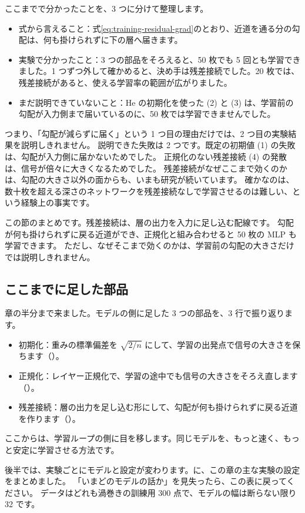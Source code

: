 ここまでで分かったことを、3 つに分けて整理します。
\begin{itemize}
\item 式から言えること：式\eqref{eq:training-residual-grad}のとおり、近道を通る分の勾配は、何も掛けられずに下の層へ届きます。
\item 実験で分かったこと：3 つの部品をそろえると、50 枚でも 5 回とも学習できました。1 つずつ外して確かめると、決め手は残差接続でした。20 枚では、残差接続があると、使える学習率の範囲が広がりました。
\item まだ説明できていないこと：He の初期化を使った (2) と (3) は、学習前の勾配が入力側まで届いているのに、50 枚では学習できませんでした。
\end{itemize}
つまり、「勾配が減らずに届く」という 1 つ目の理由だけでは、2 つ目の実験結果を説明しきれません。
説明できた失敗は 2 つです。既定の初期値 (1) の失敗は、勾配が入力側に届かないためでした。
正規化のない残差接続 (4) の発散は、信号が倍々に大きくなるためでした。
残差接続がなぜここまで効くのかは、勾配の大きさ以外の面からも、いまも研究が続いています。
確かなのは、数十枚を超える深さのネットワークを残差接続なしで学習させるのは難しい、という経験上の事実です。

この節のまとめです。残差接続は、層の出力を入力に足し込む配線です。
勾配が何も掛けられずに戻る近道ができ、正規化と組み合わせると 50 枚の MLP も学習できます。
ただし、なぜそこまで効くのかは、学習前の勾配の大きさだけでは説明しきれません。

\subsection*{ここまでに足した部品}

章の半分まで来ました。モデルの側に足した 3 つの部品を、3 行で振り返ります。
\begin{itemize}
\item 初期化：重みの標準偏差を $\sqrt{2/n}$ にして、学習の出発点で信号の大きさを保ちます（）。
\item 正規化：レイヤー正規化で、学習の途中でも信号の大きさをそろえ直します（）。
\item 残差接続：層の出力を足し込む形にして、勾配が何も掛けられずに戻る近道を作ります（）。
\end{itemize}
ここからは、学習ループの側に目を移します。同じモデルを、もっと速く、もっと安定に学習させる方法です。

後半では、実験ごとにモデルと設定が変わります。に、この章の主な実験の設定をまとめました。
「いまどのモデルの話か」を見失ったら、この表に戻ってください。
データはどれも渦巻きの訓練用 300 点で、モデルの幅は断らない限り 32 です。

